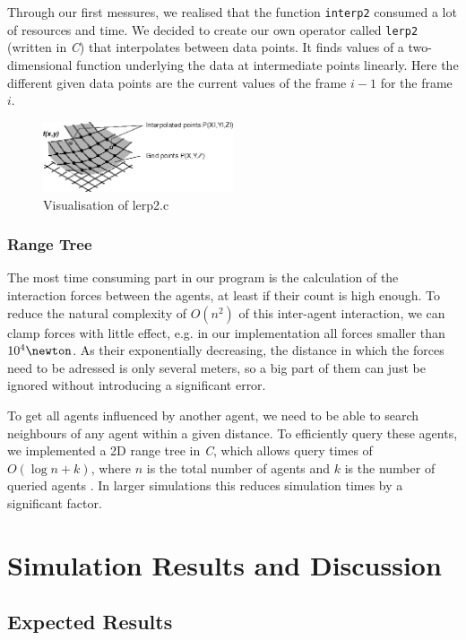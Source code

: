 \documentclass[11pt]{article}
\begin{document}
Through our first messures, we realised that the function \verb+interp2+
consumed a lot of resources and time. We decided to create our own operator
called \verb+lerp2+ (written in \textit{C}) that interpolates between data points. It finds values of a
two-dimensional function  underlying the data at intermediate points linearly.
Here the different given data points are the current values of the frame $i-1$
for the frame $i$. 

\begin{figure}[h]
\centering
\includegraphics[width=0.5\textwidth]{./images/lerp2.png}
\caption{Visualisation of lerp2.c} 
\label{lerp2 image}
\end{figure}

\subsubsection{Range Tree}
The most time consuming part in our program is the calculation of the interaction
forces between the agents, at least if their count is high enough. To reduce the
natural complexity of $O(n^{2})$ of this inter-agent interaction, we can clamp forces
with little effect, e.g. in our implementation all forces smaller than $ 10^{4}\newton$.
As their exponentially decreasing, the distance in which the forces need to be adressed
is only several meters, so a big part of them can just be ignored without introducing 
a significant error.

To get all agents influenced by another agent, we need to be able
to search neighbours of any agent within a given distance. To efficiently query 
these agents, we implemented a 2D range tree in \textit{C}, which allows query times
of $O(\log n+k)$, where $n$ is the total number of agents and $k$ is the number of
queried agents \cite{algdat}. In larger simulations this reduces simulation times by a significant factor.

\section{Simulation Results and Discussion}

\subsection{Expected Results}
\end{document}
